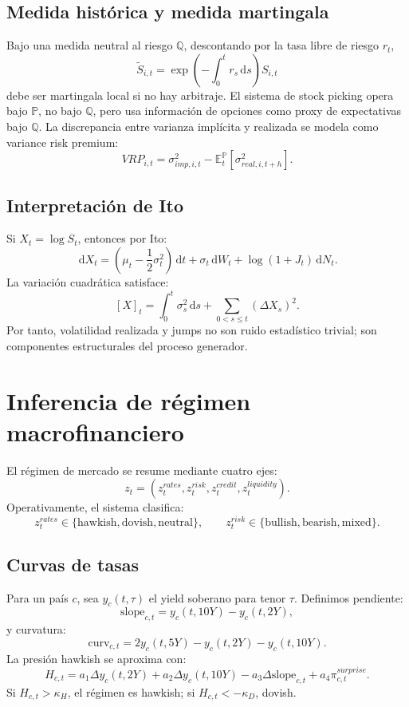 \documentclass[11pt,letterpaper]{article}
\newcommand{\E}{\mathbb{E}}
\newcommand{\Prob}{\mathbb{P}}
\newcommand{\Q}{\mathbb{Q}}
\newcommand{\1}{\mathbf{1}}
\newcommand{\dd}{\,\mathrm{d}}
\begin{document}
\subsection{Medida histórica y medida martingala}

Bajo una medida neutral al riesgo \(\Q\), descontando por la tasa libre de riesgo \(r_t\),
\[
    \tilde S_{i,t}
    =
    \exp\left(-\int_0^t r_s\dd s\right)S_{i,t}
\]
debe ser martingala local si no hay arbitraje. El sistema de stock picking opera bajo \(\Prob\), no bajo \(\Q\), pero usa información de opciones como proxy de expectativas bajo \(\Q\). La discrepancia entre varianza implícita y realizada se modela como variance risk premium:
\[
    VRP_{i,t}
    =
    \sigma^2_{imp,i,t}
    -
    \E^\Prob_t[\sigma^2_{real,i,t+h}].
\]

\subsection{Interpretación de Ito}

Si \(X_t=\log S_t\), entonces por Ito:
\[
    \dd X_t
    =
    \left(\mu_t-\frac{1}{2}\sigma_t^2\right)\dd t
    +
    \sigma_t \dd W_t
    +
    \log(1+J_t)\dd N_t.
\]
La variación cuadrática satisface:
\[
    [X]_t
    =
    \int_0^t \sigma_s^2\dd s
    +
    \sum_{0<s\le t}(\Delta X_s)^2.
\]
Por tanto, volatilidad realizada y jumps no son ruido estadístico trivial; son componentes estructurales del proceso generador.

\newpage
\section{Inferencia de régimen macrofinanciero}

El régimen de mercado se resume mediante cuatro ejes:
\[
    z_t =
    (z_t^{rates}, z_t^{risk}, z_t^{credit}, z_t^{liquidity}).
\]
Operativamente, el sistema clasifica:
\[
    z_t^{rates}\in\{\text{hawkish},\text{dovish},\text{neutral}\},
    \qquad
    z_t^{risk}\in\{\text{bullish},\text{bearish},\text{mixed}\}.
\]

\subsection{Curvas de tasas}

Para un país \(c\), sea \(y_c(t,\tau)\) el yield soberano para tenor \(\tau\). Definimos pendiente:
\[
    \text{slope}_{c,t}
    =
    y_c(t,10Y)-y_c(t,2Y),
\]
y curvatura:
\[
    \text{curv}_{c,t}
    =
    2y_c(t,5Y)-y_c(t,2Y)-y_c(t,10Y).
\]
La presión hawkish se aproxima con:
\[
    H_{c,t}
    =
    a_1\Delta y_c(t,2Y)
    +
    a_2\Delta y_c(t,10Y)
    -
    a_3\Delta \text{slope}_{c,t}
    +
    a_4\pi_{c,t}^{surprise}.
\]
Si \(H_{c,t}>\kappa_H\), el régimen es hawkish; si \(H_{c,t}<-\kappa_D\), dovish.
\end{document}
